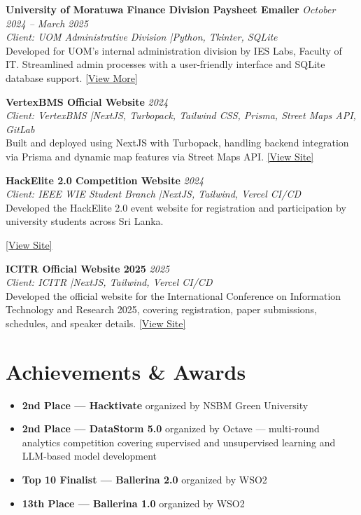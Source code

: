 \documentclass[a4paper,10pt]{article}
\newcommand{\projectsep}{\vspace{4pt}}
\newcommand{\project}[4]{%
  \noindent\textbf{#1} \hfill \textit{#2}\\[-2pt]
  \noindent\textcolor{accentblue}{\textit{#3}}\\[1pt]
  \noindent#4%
}
\begin{document}
\projectsep
\project{University of Moratuwa Finance Division Paysheet Emailer}{October 2024 -- March 2025}%
{Client: UOM Administrative Division \quad|\quad Python, Tkinter, SQLite}%
{Developed for UOM's internal administration division by IES Labs, Faculty of IT. Streamlined admin processes with a user-friendly interface and SQLite database support.
\hfill \href{https://github.com}{[View More]}}

\projectsep
\project{VertexBMS Official Website}{2024}%
{Client: VertexBMS \quad|\quad NextJS, Turbopack, Tailwind CSS, Prisma, Street Maps API, GitLab}%
{Built and deployed using NextJS with Turbopack, handling backend integration via Prisma and dynamic map features via Street Maps API.
\hfill \href{https://vertexbms.com}{[View Site]}}

\projectsep
\project{HackElite 2.0 Competition Website}{2024}%
{Client: IEEE WIE Student Branch \quad|\quad NextJS, Tailwind, Vercel CI/CD}%
{Developed the HackElite 2.0 event website for registration and participation by university students across Sri Lanka.

\hfill \href{https://hackelite.lk}{[View Site]}}

\projectsep
\project{ICITR Official Website 2025}{2025}%
{Client: ICITR \quad|\quad NextJS, Tailwind, Vercel CI/CD}%
{Developed the official website for the International Conference on Information Technology and Research 2025, covering registration, paper submissions, schedules, and speaker details.
\hfill \href{https://icitr.uom.lk}{[View Site]}}

\section{Achievements \& Awards}
\vspace{2pt}

\begin{itemize}
  \item \textbf{2nd Place --- Hacktivate} organized by NSBM Green University
  \item \textbf{2nd Place --- DataStorm 5.0} organized by Octave --- multi-round analytics competition covering supervised and unsupervised learning and LLM-based model development
  \item \textbf{Top 10 Finalist --- Ballerina 2.0} organized by WSO2
  \item \textbf{13th Place --- Ballerina 1.0} organized by WSO2
\end{itemize}
\end{document}
